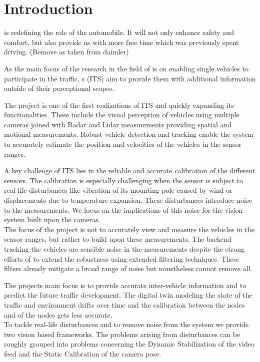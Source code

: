 
\section{Introduction}
\AD{} is redefining the role of the automobile.
It will not only enhance safety and comfort, but also provide us with more free time which was previously spent driving. (Remove as taken from daimler) 

As the main focus of the research in the field of \AD{} is on enabling single vehicles to participate in the traffic,
\ITS{}s (ITS) aim to provide them with additional information outside of their perceptional scopes.

The \Providentia{} project is one of the first realizations of ITS and quickly expanding its functionalities. These include the visual perception of vehicles using multiple cameras joined with Radar and Lidar measurements providing spatial and motional measurements.
Robust vehicle detection and tracking enable the system to accurately estimate the position and velocities of the vehicles in the sensor ranges.

A key challenge of ITS lies in the reliable and accurate calibration of the different sensors.
The calibration is especially challenging when the sensor is subject to real-life disturbances like vibration of its mounting pole caused by wind or displacements due to temperature expansion.
These disturbances introduce noise to the measurements. We focus on the implications of this noise for the vision system built upon the cameras.
\\

The focus of the project is not to accurately view and measure the vehicles in the sensor ranges, but rather to build upon these measurements. 
The backend tracking the vehicles are sensible noise in the measurements despite the strong efforts of to extend the robustness using extended filtering techniques. 
These filters already mitigate a broad range of noise but nonetheless cannot remove all.

The projects main focus is to provide accurate inter-vehicle information and to predict the future traffic development.
The digital twin modeling the state of the traffic and environment drifts over time and the calibration between the nodes and of the nodes gets less accurate.
\\

To tackle real-life disturbances and to remove noise from the system we provide two vision based frameworks. 
The problems arising from disturbances can be roughly grouped into problems concerning the Dynamic Stabilization of the video feed and the Static Calibration of the camera pose.

